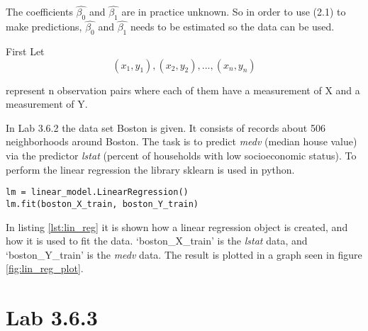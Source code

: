 The coefficients 
$\hat{\beta_0}$ and  $\hat{\beta_1}$ are in practice unknown. So in order to use (2.1) to make predictions, $\hat{\beta_0}$ and  $\hat{\beta_1}$ needs to be estimated so the data can be used. 

First Let 
\begin{equation}
(x_1, y_1), (x_2, y_2),..., (x_n, y_n)
\end{equation}

represent n observation pairs where each of them have a measurement of X and a measurement of Y.

In Lab 3.6.2 the data set Boston is given. It consists of records about 506 neighborhoods around Boston. The task is to predict \emph{medv} (median house  value) via the predictor \emph{lstat} (percent of households with low socioeconomic status).
To perform the linear regression the library sklearn is used in python. 

\lstset{}
\begin{lstlisting}[caption={Python Linear Regression function}, label=lst:lin_reg, mathescape=true]
lm = linear_model.LinearRegression()
lm.fit(boston_X_train, boston_Y_train)
\end{lstlisting}

In listing \ref{lst:lin_reg} it is shown how a linear regression object is created, and how it is used to fit the data. ‘boston\_X\_train’ is the \emph{lstat} data, and ‘boston\_Y\_train’ is the \emph{medv} data.
The result is plotted in a graph seen in figure \ref{fig:lin_reg_plot}.

 

\section{Lab 3.6.3}


